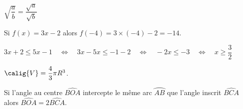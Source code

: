 $\sqrt{\dfrac a b} = \dfrac{\sqrt a}{\sqrt b}$\medskip

Si $f(x) = 3x -2$ alors $f(-4) = 3 \times (-4) - 2 = -14$.\medskip

$3x + 2 \leq 5x - 1 \quad \Leftrightarrow \quad 3x - 5x \leq -1 -2
\quad \Leftrightarrow \quad -2x \leq -3
\quad \Leftrightarrow \quad  x \geq \dfrac 32$\medskip

$\calig{V} = \dfrac4 3 \pi R^3$.\medskip

Si l'angle au centre $\widehat{BOA}$ intercepte le même arc $\wideparen{AB}$
que l'angle inscrit $\widehat{BCA}$ alors $\widehat{BOA} = 2\widehat{BCA}$.